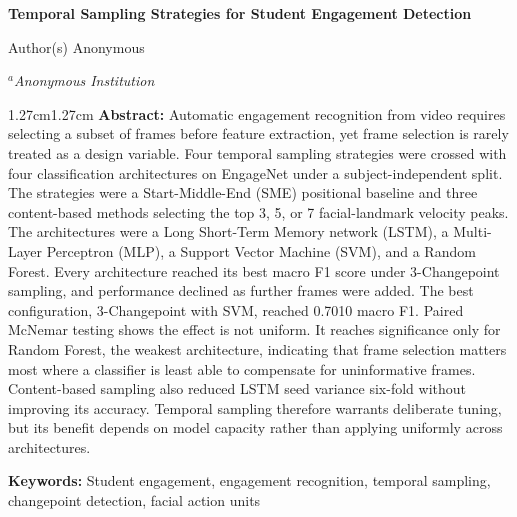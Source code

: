 \documentclass[11pt,a4paper]{article}
\begin{document}
\thispagestyle{iccefirst}
\justifying

\begin{center}
{\fontsize{22}{26}\selectfont\bfseries Temporal Sampling Strategies for Student Engagement Detection}

\vspace{0.35cm}

{\large Author(s) Anonymous}

\vspace{0.2cm}

{\itshape $^{a}$Anonymous Institution}

\vspace{0.15cm}

\end{center}

\vspace{0.3cm}

\begin{adjustwidth}{1.27cm}{1.27cm}
\fontsize{10}{12}\selectfont
\noindent\textbf{Abstract:} Automatic engagement recognition from video requires selecting a subset of frames before feature extraction, yet frame selection is rarely treated as a design variable. Four temporal sampling strategies were crossed with four classification architectures on EngageNet under a subject-independent split. The strategies were a Start-Middle-End (SME) positional baseline and three content-based methods selecting the top 3, 5, or 7 facial-landmark velocity peaks. The architectures were a Long Short-Term Memory network (LSTM), a Multi-Layer Perceptron (MLP), a Support Vector Machine (SVM), and a Random Forest. Every architecture reached its best macro F1 score under 3-Changepoint sampling, and performance declined as further frames were added. The best configuration, 3-Changepoint with SVM, reached 0.7010 macro F1. Paired McNemar testing shows the effect is not uniform. It reaches significance only for Random Forest, the weakest architecture, indicating that frame selection matters most where a classifier is least able to compensate for uninformative frames. Content-based sampling also reduced LSTM seed variance six-fold without improving its accuracy. Temporal sampling therefore warrants deliberate tuning, but its benefit depends on model capacity rather than applying uniformly across architectures.

\vspace{0.2cm}
\noindent\textbf{Keywords:} Student engagement, engagement recognition, temporal sampling, changepoint detection, facial action units
\end{adjustwidth}
\end{document}
